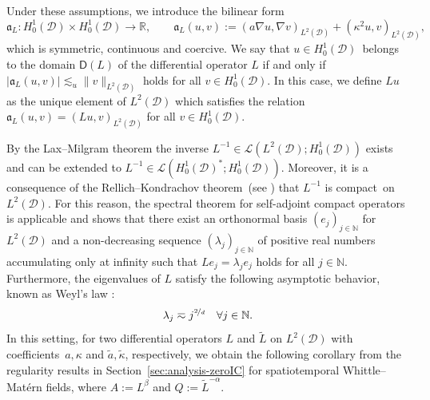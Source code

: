 \documentclass[reqno]{amsart}
\numberwithin{equation}{section}
\newcommand{\R}{\mathbb{R}}
\newcommand{\N}{\mathbb{N}}
\newcommand{\cD}{\mathcal{D}}
\newcommand{\norm}[2]{     \| #1       \|_{ #2 }}
\newcommand{\from}{\colon}
\theoremstyle{remark}
\theoremstyle{definition}
\begin{document}
Under these assumptions, 
we introduce the bilinear form
%
\[ 
\mathfrak{a}_L \from H_0^1(\cD)\times H_0^1(\cD) \to \R, 
\qquad
\mathfrak{a}_L(u,v) := 
(a\nabla u, \nabla v)_{L^2(\cD)}
+
(\kappa^2 u,v)_{L^2(\cD)}, 
\] 
%
which is symmetric, continuous and coercive. 
We say that $u \in H^1_0(\cD)$~belongs to the domain 
$\mathsf D(L)$ of the differential operator $L$ if and only if 
$|\mathfrak{a}_L(u,v) | 
\lesssim_u
\norm{v}{L^2(\cD)}$
holds for all
$v \in H^1_0(\cD)$. 
In this case, we define
$Lu$ as the unique element of $L^2(\cD)$ 
which satisfies the relation  
$\mathfrak{a}_L(u,v) = (Lu,v)_{L^2(\cD)}$ 
for all $v \in H^1_0(\cD)$.
% 

By the Lax--Milgram theorem
the inverse $L^{-1} \in \mathscr L(L^2(\cD); H_0^1(\cD)) $ exists and can be  
extended to 
$L^{-1} \in \mathscr L(H_0^1(\cD)^*; H_0^1(\cD))$. 
Moreover, 
it is a consequence of the Rellich--Kondrachov 
theorem~(see \cite[Theorem~6.3]{AdamsFournier2003}) 
that $L^{-1}$ is compact~on~$L^2(\cD)$. 
For this reason, the spectral theorem 
for self-adjoint compact operators 
is applicable and shows that there exist
an orthonormal basis $(e_j)_{j\in \N}$ for $L^2(\cD)$ and
a non-decreasing sequence $(\lambda_j)_{j\in\N}$ 
of positive real numbers accumulating only at 
infinity such that $L e_j = \lambda_j e_j$ holds for all $j\in\N$. 
Furthermore, the eigenvalues 
of $L$ satisfy the following asymptotic behavior, 
known as Weyl's law 
\cite[Theorem~6.3.1]{Davies}:
% 
\begin{equation}\label{eq:weyl}
\lambda_j 
\eqsim
j^{\nicefrac{2}{d}}
\quad 
\forall j \in \N.
\end{equation}
%
In this setting, for two differential operators 
$L$ and $\widetilde{L}$ on $L^2(\cD)$ 
with coefficients~$a,\kappa$ 
and $\widetilde{a},\widetilde{\kappa}$, respectively, 
we obtain the following corollary from the regularity results in
Section~\ref{sec:analysis-zeroIC} 
for spatiotemporal Whittle--Mat\'ern 
fields, where $A:=L^\beta$ and $Q:=\widetilde{L}^{-\alpha}$\!. 
\end{document}
